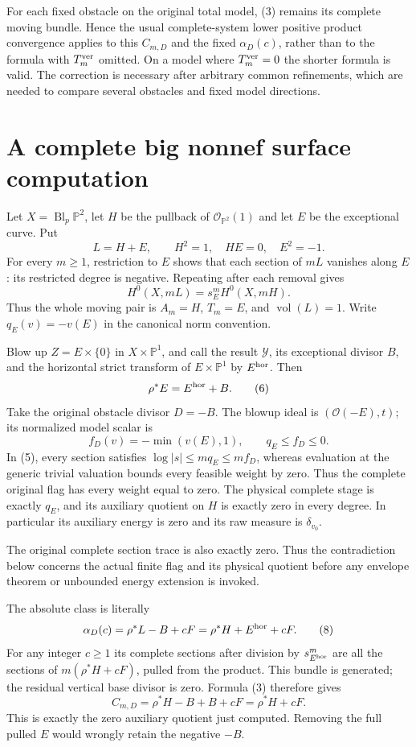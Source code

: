 \documentclass[11pt]{article}
\newcommand{\OO}{\mathcal O}
\newcommand{\vol}{\operatorname{vol}}
\begin{document}
For each fixed obstacle on the original total model, (3) remains its
complete moving bundle. Hence the usual complete-system lower positive
product convergence applies to this $C_{m,D}$ and the fixed
$\alpha_D(c)$, rather than to the formula with $T_m^{\rm ver}$ omitted.
On a model where $T_m^{\rm ver}=0$ the shorter formula is valid.
The correction is necessary after arbitrary common refinements, which
are needed to compare several obstacles and fixed model directions.

\section*{A complete big nonnef surface computation}
Let $X=\operatorname{Bl}_p\mathbb P^2$, let $H$ be the pullback of
$\OO_{\mathbb P^2}(1)$ and let $E$ be the exceptional curve. Put
\[
 L=H+E,\qquad H^2=1,\quad H E=0,\quad E^2=-1.
\]
For every $m\geq1$, restriction to $E$ shows that each section of
$mL$ vanishes along $E$: its restricted degree is negative. Repeating
after each removal gives
\[
 H^0(X,mL)=s_E^m H^0(X,mH).
                                                        \tag{5}
\]
Thus the whole moving pair is $A_m=H$, $T_m=E$, and $\vol(L)=1$.
Write $q_E(v)=-v(E)$ in the canonical norm convention.

Blow up $Z=E\times\{0\}$ in $X\times\mathbb P^1$, and call the
result $\mathcal Y$, its exceptional divisor $B$, and the horizontal
strict transform of $E\times\mathbb P^1$ by $E^{\rm hor}$. Then
\[
 \rho^*E=E^{\rm hor}+B.                                \tag{6}
\]
Take the original obstacle divisor $D=-B$. The blowup ideal is
$(\OO(-E),t)$; its normalized model scalar is
\[
 f_D(v)=-\min(v(E),1),\qquad q_E\leq f_D\leq0.         \tag{7}
\]
In (5), every section satisfies $\log|s|\leq mq_E\leq mf_D$,
whereas evaluation at the generic trivial valuation bounds every
feasible weight by zero. Thus the complete original flag has every
weight equal to zero. The physical complete stage is exactly $q_E$,
and its auxiliary quotient on $H$ is exactly zero in every degree.
In particular its auxiliary energy is zero and its raw measure is
$\delta_{v_0}$.

The original complete section trace is also exactly zero. Thus the
contradiction below concerns the actual finite flag and its physical
quotient before any envelope theorem or unbounded energy extension
is invoked.

The absolute class is literally
\[
 \alpha_D(c)=\rho^*L-B+cF
            =\rho^*H+E^{\rm hor}+cF.                   \tag{8}
\]
For any integer $c\geq1$ its complete sections after division by
$s_{E^{\rm hor}}^m$ are all the sections of
$m(\rho^*H+cF)$, pulled from the product. This bundle is generated;
the residual vertical base divisor is zero. Formula (3) therefore gives
\[
 C_{m,D}=\rho^*H-B+B+cF=\rho^*H+cF.                    \tag{9}
\]
This is exactly the zero auxiliary quotient just computed. Removing
the full pulled $E$ would wrongly retain the negative $-B$.
\end{document}
